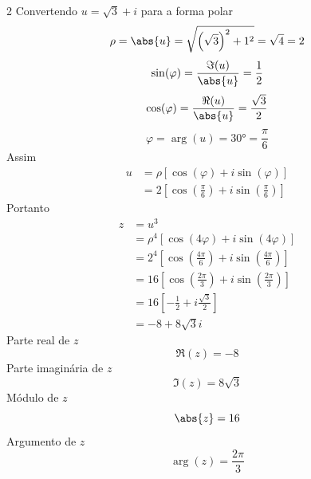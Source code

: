 \documentclass[a4paper,12pt,fleqn]{article}
\begin{document}
\begin{answer}
\setlength\columnsep{3em}
\begin{multicols}{2}
  \raggedcolumns
  \setlength{\jot}{5pt}
  Convertendo $u=\sqrt{3}+i$ para a forma polar
  \[
    \rho
    = \abs{u}
    = \sqrt{\left(\sqrt{3}\right)^2 + 1^2}
    = \sqrt{4}
    = 2
  \]
  \[
    \sin(\varphi) = \frac{\Im(u)}{\abs{u}} = \frac{1}{2}
  \]
  \[
    \cos(\varphi) = \frac{\Re(u)}{\abs{u}} = \frac{\sqrt{3}}{2}
  \]
  \[
    \varphi = \arg(u) = \ang{30} = \frac{\pi}{6}
  \]
  Assim
  \begin{align*}
    u
    & = \rho\left[\cos\left(\varphi\right)+ i\sin\left(\varphi\right)\right] \\
    & = 2\left[\cos\left(\frac{\pi}{6}\right)+ i\sin\left(\frac{\pi}{6}\right)\right]
  \end{align*}
  Portanto
  \begin{align*}
    z
    & = u^3 \\[2mm]
    & = \rho^4\left[\cos\left(4\varphi\right)+ i\sin\left(4\varphi\right)\right] \\[2mm]
    & = 2^4\left[\cos\left(\frac{4\pi}{6}\right)+ i\sin\left(\frac{4\pi}{6}\right)\right] \\[2mm]
    & = 16\left[\cos\left(\frac{2\pi}{3}\right)+ i\sin\left(\frac{2\pi}{3}\right)\right] \\[2mm]
    & = 16\left[-\frac{1}{2}+ i\frac{\sqrt{3}}{2}\right] \\[2mm]
    & = -8 + 8\sqrt{3}i
  \end{align*}
  Parte real de $z$
  \[
    \Re(z) = -8
  \]
  Parte imaginária de $z$
  \[
    \Im(z) = 8\sqrt{3}
  \]
  Módulo de $z$
  \[
    \abs{z} = 16
  \]
  Argumento de $z$
  \[
    \arg(z) = \frac{2\pi}{3}
  \]
\end{multicols}
\end{answer}

\end{document}
